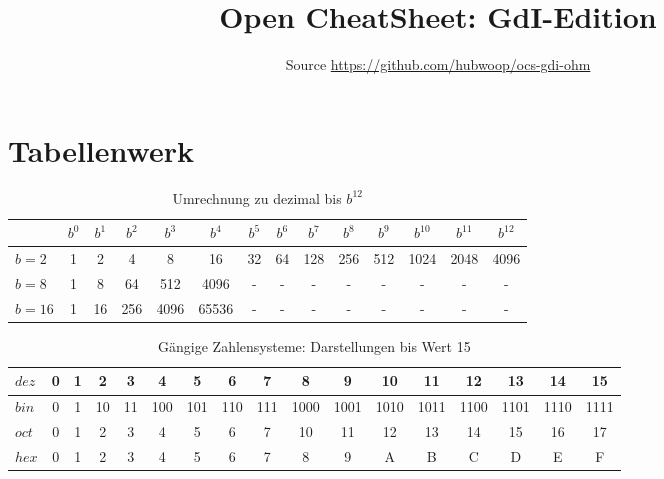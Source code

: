 \documentclass[a4paper]{article}
\title{Open CheatSheet: GdI-Edition}
\author{Source \url{https://github.com/hubwoop/ocs-gdi-ohm}}
\begin{document}
\maketitle

\section{Tabellenwerk}
	\begin{table}[H]
	\centering
	\caption{Umrechnung zu dezimal bis $b^{12}$}
	\label{gaengigeWerte}
	\begin{tabular}{l|c|c|c|c|c|c|c|c|c|c|c|c|c}
	         & $b^{0}$&$b^{1}$&$b^{2}$&$b^{3}$&$b^{4}$&$b^{5}$&$b^{6}$&$b^{7}$&$b^{8}$&$b^{9}$&$b^{10}$&$b^{11}$&$b^{12}$ \\ \hline\hline
	$b = 2$  & 1      & 2     & 4     & 8     & 16    & 32    & 64    & 128   & 256   & 512   & 1024   & 2048   & 4096    \\
	$b = 8$  & 1      & 8     & 64    & 512   & 4096  & -     & -     & -     & -     & -     & -      & -      & -       \\
	$b = 16$ & 1      & 16    & 256   & 4096  & 65536 & -     & -     & -     & -     & -     & -      & -      & -       \\
	\end{tabular}
	\end{table}

	\begin{table}[H]
	\centering
	\caption{Gängige Zahlensysteme: Darstellungen bis Wert 15}
	\label{hexWerte}
	\begin{tabular}{l|c|c|c|c|c|c|c|c|c|c|c|c|c|c|c|c}
	$dez$ & 0 & 1 & 2  & 3  & 4   & 5   & 6     & 7     & 8    & 9    & 10   & 11   & 12   & 13   & 14   & 15   \\ \hline\hline
	$bin$ & 0 & 1 & 10 & 11 & 100 & 101 & 110   & 111   & 1000 & 1001 & 1010 & 1011 & 1100 & 1101 & 1110 & 1111 \\
	$oct$ & 0 & 1 & 2  & 3  & 4   & 5   & 6     & 7     & 10   & 11   & 12   & 13   & 14   & 15   & 16   & 17   \\
	$hex$ & 0 & 1 & 2  & 3  & 4   & 5   & 6     & 7     & 8    & 9    & A    & B    & C    & D    & E    & F    \\
	\end{tabular}
	\end{table}
\end{document}
